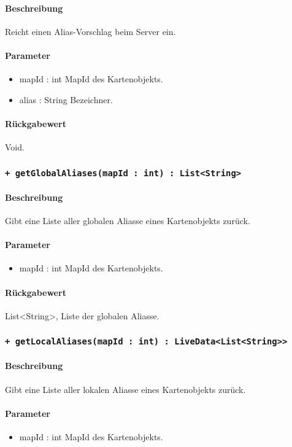 \paragraph*{Beschreibung}
Reicht einen Alias-Vorschlag beim Server ein.
\paragraph*{Parameter}
\begin{itemize}
    \item mapId : int MapId des Kartenobjekts.
    \item alias : String Bezeichner.
\end{itemize}
\paragraph*{Rückgabewert}
Void.

\subsubsection*{\texttt{+ getGlobalAliases(mapId : int) : List<String>}}%
\paragraph*{Beschreibung}
Gibt eine Liste aller globalen Aliasse eines Kartenobjekts zurück.
\paragraph*{Parameter}
\begin{itemize}
    \item mapId : int MapId des Kartenobjekts.
\end{itemize}
\paragraph*{Rückgabewert}
List<String>, Liste der globalen Aliasse.

\subsubsection*{\texttt{+ getLocalAliases(mapId : int) : LiveData<List<String>>}}%
\paragraph*{Beschreibung}
Gibt eine Liste aller lokalen Aliasse eines Kartenobjekts zurück.
\paragraph*{Parameter}
\begin{itemize}
    \item mapId : int MapId des Kartenobjekts.
\end{itemize}
